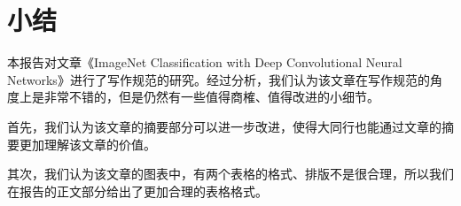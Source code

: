\chapter{小结}\label{chap:conclude}
本报告对文章《ImageNet Classiﬁcation with Deep Convolutional Neural Networks》进行了写作规范的研究。经过分析，我们认为该文章在写作规范的角度上是非常不错的，但是仍然有一些值得商榷、值得改进的小细节。

首先，我们认为该文章的摘要部分可以进一步改进，使得大同行也能通过文章的摘要更加理解该文章的价值。

其次，我们认为该文章的图表中，有两个表格的格式、排版不是很合理，所以我们在报告的正文部分给出了更加合理的表格格式。
